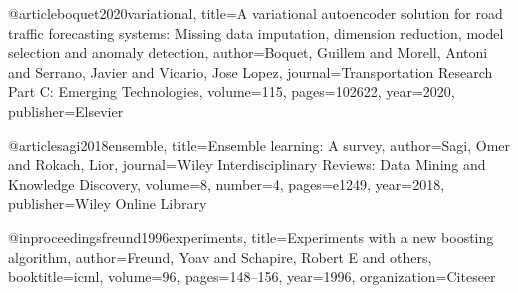 @article{boquet2020variational,
  title={A variational autoencoder solution for road traffic forecasting systems: Missing data imputation, dimension reduction, model selection and anomaly detection},
  author={Boquet, Guillem and Morell, Antoni and Serrano, Javier and Vicario, Jose Lopez},
  journal={Transportation Research Part C: Emerging Technologies},
  volume={115},
  pages={102622},
  year={2020},
  publisher={Elsevier}
}

@article{sagi2018ensemble,
  title={Ensemble learning: A survey},
  author={Sagi, Omer and Rokach, Lior},
  journal={Wiley Interdisciplinary Reviews: Data Mining and Knowledge Discovery},
  volume={8},
  number={4},
  pages={e1249},
  year={2018},
  publisher={Wiley Online Library}
}

@inproceedings{freund1996experiments,
  title={Experiments with a new boosting algorithm},
  author={Freund, Yoav and Schapire, Robert E and others},
  booktitle={icml},
  volume={96},
  pages={148--156},
  year={1996},
  organization={Citeseer}
}